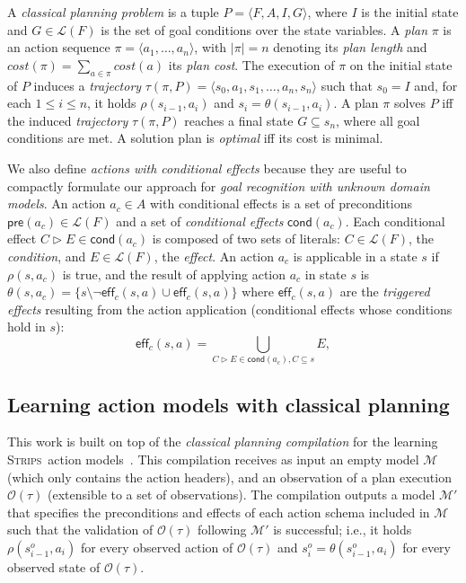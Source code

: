 \documentclass{article}
\newcommand{\tup}[1]{{\langle #1 \rangle}}
\newcommand{\pre}{\mathsf{pre}}     %
\newcommand{\eff}{\mathsf{eff}}     %
\newcommand{\cond}{\mathsf{cond}}   %
\newcommand{\strips}{\textsc{Strips}}
\begin{document}
A {\em classical planning problem} is a tuple $P=\tup{F,A,I,G}$, where $I$ is the initial state and $G\in\mathcal{L}(F)$ is the set of goal conditions over the state variables. A {\em plan} $\pi$ is an action sequence $\pi=\tup{a_1, \ldots, a_n}$, with $|\pi|=n$ denoting its {\em plan length} and $cost(\pi)=\sum_{a\in\pi} cost(a)$ its {\em plan cost}. The execution of $\pi$ on the initial state of $P$ induces a {\em trajectory} $\tau(\pi,P)=\tup{s_0, a_1, s_1, \ldots, a_n, s_n}$ such that $s_0=I$ and, for each {\small $1\leq i\leq n$}, it holds $\rho(s_{i-1},a_i)$ and $s_i=\theta(s_{i-1},a_i)$. A plan $\pi$ solves $P$ iff the induced {\em trajectory} $\tau(\pi,P)$ reaches a final state $G \subseteq s_n$, where all goal conditions are met. A solution plan is {\em optimal} iff its cost is minimal.

We also define {\em actions with conditional effects} because they are useful to compactly formulate our approach for {\em goal recognition with unknown domain models}. An action $a_c\in A$ with conditional effects is a set of preconditions $\pre(a_c)\in\mathcal{L}(F)$ and a set of {\em conditional effects} $\cond(a_c)$. Each conditional effect $C\rhd E\in\cond(a_c)$ is composed of two sets of literals: $C\in\mathcal{L}(F)$, the {\em condition}, and $E\in\mathcal{L}(F)$, the {\em effect}. An action $a_c$ is applicable in a state $s$ if $\rho(s,a_c)$ is true, and the result of applying action $a_c$ in state $s$ is $\theta(s,a_c)=\{s\setminus\neg\eff_c(s,a)\cup\eff_c(s,a)\}$ where $\eff_c(s,a)$ are the {\em triggered effects} resulting from the action application (conditional effects whose conditions hold in $s$):
\[
\eff_c(s,a)=\bigcup_{C\rhd E\in\cond(a_c),C\subseteq s} E,
\]

\subsection{Learning action models with classical planning}
This work is built on top of the {\em classical planning compilation} for the learning \strips\ action models~\cite{aineto2018learning}. This compilation receives as input an empty model $\mathcal{M}$ (which only contains the action headers), and an observation of a plan execution $\mathcal{O}(\tau)$ (extensible to a set of observations). The compilation outputs a model $\mathcal{M'}$ that specifies the preconditions and effects of each action schema included in $\mathcal{M}$ such that the validation of $\mathcal{O}(\tau)$ following $\mathcal{M'}$ is successful; i.e., it holds $\rho(s_{i-1}^o,a_i)$ for every observed action of $\mathcal{O}(\tau)$ and $s_i^o=\theta(s_{i-1}^o,a_i)$ for every observed state of $\mathcal{O}(\tau)$.
\end{document}
